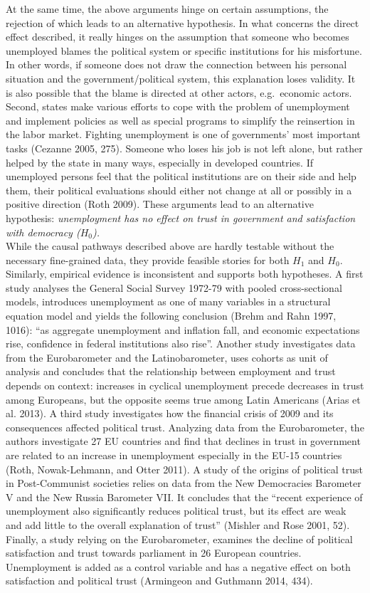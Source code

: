 \documentclass[12pt,]{article}
\begin{document}
At the same time, the above arguments hinge on certain assumptions, the rejection of which leads to an alternative hypothesis. In what concerns the direct effect described, it really hinges on the assumption that someone who becomes unemployed blames the political system or specific institutions for his misfortune. In other words, if someone does not draw the connection between his personal situation and the government/political system, this explanation loses validity. It is also possible that the blame is directed at other actors, e.g.~economic actors.\\
Second, states make various efforts to cope with the problem of unemployment and implement policies as well as special programs to simplify the reinsertion in the labor market. Fighting unemployment is one of governments' most important tasks (Cezanne 2005, 275). Someone who loses his job is not left alone, but rather helped by the state in many ways, especially in developed countries. If unemployed persons feel that the political institutions are on their side and help them, their political evaluations should either not change at all or possibly in a positive direction (Roth 2009). These arguments lead to an alternative hypothesis: \emph{unemployment has no effect on trust in government and satisfaction with democracy (\(H_{0}\)).}\\
While the causal pathways described above are hardly testable without the necessary fine-grained data, they provide feasible stories for both \(H_{1}\) and \(H_{0}\). Similarly, empirical evidence is inconsistent and supports both hypotheses. A first study analyses the General Social Survey 1972-79 with pooled cross-sectional models, introduces unemployment as one of many variables in a structural equation model and yields the following conclusion (Brehm and Rahn 1997, 1016): ``as aggregate unemployment and inflation fall, and economic expectations rise, confidence in federal institutions also rise''. Another study investigates data from the Eurobarometer and the Latinobarometer, uses cohorts as unit of analysis and concludes that the relationship between employment and trust depends on context: increases in cyclical unemployment precede decreases in trust among Europeans, but the opposite seems true among Latin Americans (Arias et al. 2013). A third study investigates how the financial crisis of 2009 and its consequences affected political trust. Analyzing data from the Eurobarometer, the authors investigate 27 EU countries and find that declines in trust in government are related to an increase in unemployment especially in the EU-15 countries (Roth, Nowak-Lehmann, and Otter 2011). A study of the origins of political trust in Post-Communist societies relies on data from the New Democracies Barometer V and the New Russia Barometer VII. It concludes that the ``recent experience of unemployment also significantly reduces political trust, but its effect are weak and add little to the overall explanation of trust'' (Mishler and Rose 2001, 52). Finally, a study relying on the Eurobarometer, examines the decline of political satisfaction and trust towards parliament in 26 European countries. Unemployment is added as a control variable and has a negative effect on both satisfaction and political trust (Armingeon and Guthmann 2014, 434).
\end{document}
